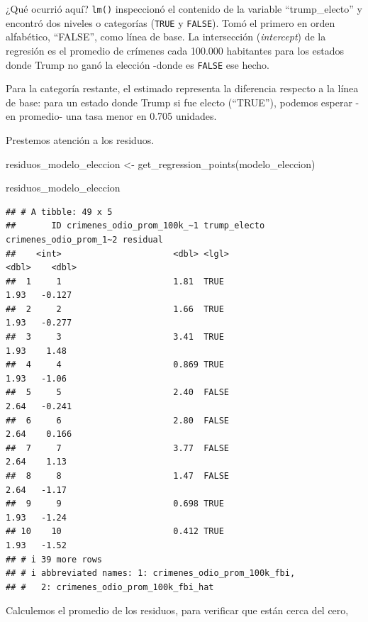 \documentclass[
]{book}
\newenvironment{Shaded}{\begin{snugshade}}{\end{snugshade}}
\newcommand{\FunctionTok}[1]{\textcolor[rgb]{0.00,0.00,0.00}{#1}}
\newcommand{\NormalTok}[1]{#1}
\newcommand{\OtherTok}[1]{\textcolor[rgb]{0.56,0.35,0.01}{#1}}
\begin{document}
¿Qué ocurrió aquí? \texttt{lm()} inspeccionó el contenido de la variable ``trump\_electo'' y encontró dos niveles o categorías (\texttt{TRUE} y \texttt{FALSE}). Tomó el primero en orden alfabético, ``FALSE'', como línea de base. La intersección (\emph{intercept}) de la regresión es el promedio de crímenes cada 100.000 habitantes para los estados donde Trump no ganó la elección -donde es \texttt{FALSE} ese hecho.

Para la categoría restante, el estimado representa la diferencia respecto a la línea de base: para un estado donde Trump si fue electo (``TRUE''), podemos esperar -en promedio- una tasa menor en 0.705 unidades.

Prestemos atención a los residuos.

\begin{Shaded}
\begin{Highlighting}[]
\NormalTok{residuos\_modelo\_eleccion }\OtherTok{\textless{}{-}} \FunctionTok{get\_regression\_points}\NormalTok{(modelo\_eleccion)}

\NormalTok{residuos\_modelo\_eleccion}
\end{Highlighting}
\end{Shaded}

\begin{verbatim}
## # A tibble: 49 x 5
##       ID crimenes_odio_prom_100k_~1 trump_electo crimenes_odio_prom_1~2 residual
##    <int>                      <dbl> <lgl>                         <dbl>    <dbl>
##  1     1                      1.81  TRUE                           1.93   -0.127
##  2     2                      1.66  TRUE                           1.93   -0.277
##  3     3                      3.41  TRUE                           1.93    1.48 
##  4     4                      0.869 TRUE                           1.93   -1.06 
##  5     5                      2.40  FALSE                          2.64   -0.241
##  6     6                      2.80  FALSE                          2.64    0.166
##  7     7                      3.77  FALSE                          2.64    1.13 
##  8     8                      1.47  FALSE                          2.64   -1.17 
##  9     9                      0.698 TRUE                           1.93   -1.24 
## 10    10                      0.412 TRUE                           1.93   -1.52 
## # i 39 more rows
## # i abbreviated names: 1: crimenes_odio_prom_100k_fbi,
## #   2: crimenes_odio_prom_100k_fbi_hat
\end{verbatim}

Calculemos el promedio de los residuos, para verificar que están cerca del cero,
\end{document}
